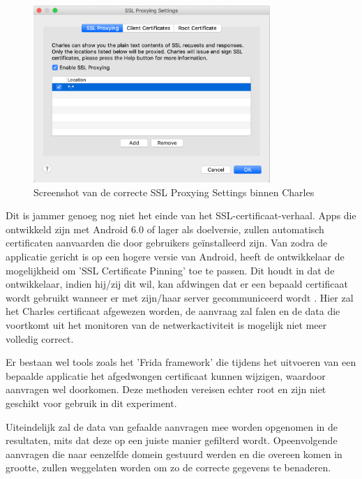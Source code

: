 \begin{figure}
    \centering
    \includegraphics[width=0.8\textwidth]{img/charlessslsettings.png}
    \caption{Screenshot van de correcte SSL Proxying Settings binnen Charles}
    \label{fig:charlessslsettings}
\end{figure}

Dit is jammer genoeg nog niet het einde van het SSL-certificaat-verhaal. Apps die ontwikkeld zijn met Android 6.0 of lager als doelversie, zullen automatisch certificaten aanvaarden die door gebruikers geïnstalleerd zijn. Van zodra de applicatie gericht is op een hogere versie van Android, heeft de ontwikkelaar de mogelijkheid om 'SSL Certificate Pinning' toe te passen. Dit houdt in dat de ontwikkelaar, indien hij/zij dit wil, kan afdwingen dat er een bepaald certificaat wordt gebruikt wanneer er met zijn/haar server gecommuniceerd wordt \autocite{wass_ssl-pinning}. Hier zal het Charles certificaat afgewezen worden, de aanvraag zal falen en de data die voortkomt uit het monitoren van de netwerkactiviteit is mogelijk niet meer volledig correct.

Er bestaan wel tools zoals het 'Frida framework' die tijdens het uitvoeren van een bepaalde applicatie het afgedwongen certificaat kunnen wijzigen, waardoor aanvragen wel doorkomen. Deze methoden vereisen echter root en zijn niet geschikt voor gebruik in dit experiment.

Uiteindelijk zal de data van gefaalde aanvragen mee worden opgenomen in de resultaten, mits dat deze op een juiste manier gefilterd wordt. Opeenvolgende aanvragen die naar eenzelfde domein gestuurd werden en die overeen komen in grootte, zullen weggelaten worden om zo de correcte gegevens te benaderen.

